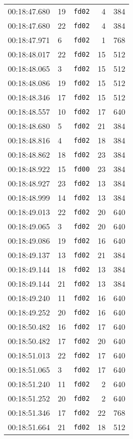 \documentclass{article}
\begin{document}
\begin{longtable}{lllrr}
00:18:47.680 & 19 & \texttt{fd02} & 4 & 384 \\
00:18:47.680 & 22 & \texttt{fd02} & 4 & 384 \\
00:18:47.971 & 6 & \texttt{fd02} & 1 & 768 \\
00:18:48.017 & 22 & \texttt{fd02} & 15 & 512 \\
00:18:48.065 & 3 & \texttt{fd02} & 15 & 512 \\
00:18:48.086 & 19 & \texttt{fd02} & 15 & 512 \\
00:18:48.346 & 17 & \texttt{fd02} & 15 & 512 \\
00:18:48.557 & 10 & \texttt{fd02} & 17 & 640 \\
00:18:48.680 & 5 & \texttt{fd02} & 21 & 384 \\
00:18:48.816 & 4 & \texttt{fd02} & 18 & 384 \\
00:18:48.862 & 18 & \texttt{fd02} & 23 & 384 \\
00:18:48.922 & 15 & \texttt{fd00} & 23 & 384 \\
00:18:48.927 & 23 & \texttt{fd02} & 13 & 384 \\
00:18:48.999 & 14 & \texttt{fd02} & 13 & 384 \\
00:18:49.013 & 22 & \texttt{fd02} & 20 & 640 \\
00:18:49.065 & 3 & \texttt{fd02} & 20 & 640 \\
00:18:49.086 & 19 & \texttt{fd02} & 16 & 640 \\
00:18:49.137 & 13 & \texttt{fd02} & 21 & 384 \\
00:18:49.144 & 18 & \texttt{fd02} & 13 & 384 \\
00:18:49.144 & 21 & \texttt{fd02} & 13 & 384 \\
00:18:49.240 & 11 & \texttt{fd02} & 16 & 640 \\
00:18:49.252 & 20 & \texttt{fd02} & 16 & 640 \\
00:18:50.482 & 16 & \texttt{fd02} & 17 & 640 \\
00:18:50.482 & 17 & \texttt{fd02} & 20 & 640 \\
00:18:51.013 & 22 & \texttt{fd02} & 17 & 640 \\
00:18:51.065 & 3 & \texttt{fd02} & 17 & 640 \\
00:18:51.240 & 11 & \texttt{fd02} & 2 & 640 \\
00:18:51.252 & 20 & \texttt{fd02} & 2 & 640 \\
00:18:51.346 & 17 & \texttt{fd02} & 22 & 768 \\
00:18:51.664 & 21 & \texttt{fd02} & 18 & 512 \\

\end{longtable}
\end{document}
